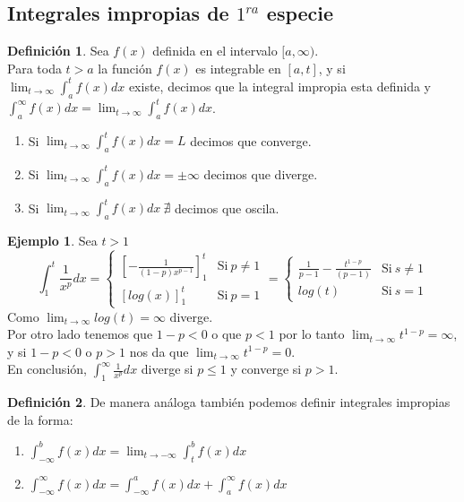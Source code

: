 \documentclass[10pt]{article}
\theoremstyle{definition}
\newtheorem{definition}{Definición}[section]
\newtheorem{example}{Ejemplo}[section]
\begin{document}
\subsection{Integrales impropias de $1^{ra}$ especie}
\begin{definition}
	Sea $f(x)$ definida en el intervalo $[a,\infty)$.
	\\Para toda $t>a$ la función $f(x)$ es integrable en $[a,t]$, y si $\lim_{t \to \infty} \int_{a}^{t} f(x) dx$ existe, decimos que la integral impropia esta definida y $\int_{a}^{\infty} f(x) dx=\lim_{t \to \infty} \int_{a}^{t} f(x) dx$.
	\begin{enumerate}
		\item Si $\lim_{t \to \infty} \int_{a}^{t} f(x) dx=L$ decimos que converge.
		\item Si $\lim_{t \to \infty} \int_{a}^{t} f(x) dx=\pm\infty$ decimos que diverge.
		\item Si $\lim_{t \to \infty} \int_{a}^{t} f(x) dx\ \nexists$ decimos que oscila.
	\end{enumerate}
\end{definition}
\begin{example}
	Sea $t>1$ $$\int _{1}^{t}\frac{1}{x^{p}} dx=\begin{cases}
			\left[ -\frac{1}{( 1-p) x^{p-1}}\right]_{1}^{t} & \text{Si} \ p\neq 1 \\
			[ log( x)]_{1}^{t}                              & \text{Si} \ p=1
		\end{cases} =\begin{cases}
			\frac{1}{p-1}-\frac{t^{1-p}}{(p-1)} & \text{Si} \ s\neq 1 \\
			log( t)                             & \text{Si} \ s=1
		\end{cases}$$
	Como $\lim_{t \to \infty} log(t)=\infty$ diverge.
	\\Por otro lado tenemos que $1-p<0$ o que $p<1$ por lo tanto $\lim_{t \to \infty} t^{1-p}=\infty$, y si $1-p<0$ o $p>1$ nos da que $\lim_{t \to \infty}t^{1-p}=0$.
	\\En conclusión, $\int_{1}^{\infty} \frac{1}{x^p} dx$ diverge si $p\le 1$ y converge si $p>1$.
\end{example}
\begin{definition}
	De manera análoga también podemos definir integrales impropias de la forma:
	\begin{enumerate}
		\item $\int_{-\infty}^{b} f(x) dx=\lim_{t \to -\infty}\int_{t}^{b} f(x) dx$
		\item $\int_{-\infty}^{\infty} f(x) dx=\int_{-\infty}^{a} f(x) dx + \int_{a}^{\infty} f(x) dx$
	\end{enumerate}
\end{definition}
\end{document}
